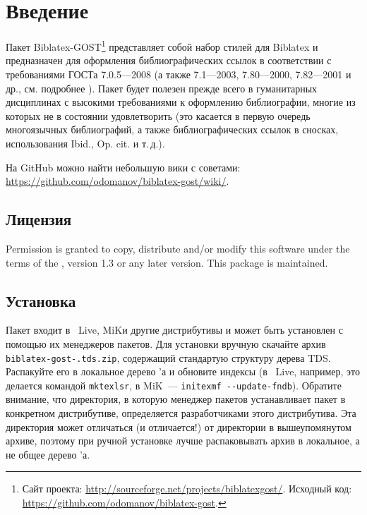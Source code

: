 \documentclass[10pt,a4paper,headings=small,numbers=enddot,english,russian]{ltxdockit}
\newcommand*{\biblatex}{Biblatex\xspace}
\newcommand*{\biblatexgost}{Biblatex-GOST\xspace}
\begin{document}
\printtitlepage
\tableofcontents
\listoftables

\section{Введение}
\label{sec:int}

Пакет \biblatexgost{}\footnote{Сайт проекта:
  \url{http://sourceforge.net/projects/biblatexgost/}. Исходный код:
  \url{https://github.com/odomanov/biblatex-gost}.} представляет собой
набор стилей для
\biblatex{}\unspace{}
и предназначен для оформления библиографических ссылок в соответствии
с требованиями ГОСТа 7.0.5---2008 (а также 7.1---2003, 7.80---2000,
7.82---2001 и др., см. подробнее ).
Пакет будет полезен прежде всего в гуманитарных дисциплинах с высокими
требованиями к оформлению библиографии, многие из которых \bibtex не в
состоянии удовлетворить (это касается в первую очередь многоязычных
библиографий, а также библиографических ссылок в сносках,
использования Ibid., Op. cit. и т.\,д.).

На GitHub можно найти небольшую вики с советами:
\url{https://github.com/odomanov/biblatex-gost/wiki/}.

\subsection{Лицензия}
\label{sec:lic}

Permission is granted to copy, distribute and\slash or modify this software under the
terms of the \lppl, version 1.3 or any later
version.
This package is maintained.

\subsection{Установка}
\label{sec:install}

Пакет входит в \tex~Live, MiK\tex и другие дистрибутивы и может быть установлен
с помощью их менеджеров пакетов. Для установки вручную скачайте архив
\texttt{biblatex-gost-.tds.zip}, содержащий стандартую структуру дерева TDS.
Распакуйте его в локальное дерево \tex'а и
обновите индексы (в \tex~Live, например, это делается командой \texttt{mktexlsr},
в MiK\tex~--- \texttt{initexmf -{}-update-fndb}). Обратите внимание, что директория,
в которую менеджер пакетов устанавливает пакет в конкретном дистрибутиве,
определяется разработчиками этого дистрибутива.
Эта директория может отличаться (и отличается!) от директории
в вышеупомянутом архиве, поэтому при ручной установке лучше распаковывать
архив в локальное, а не общее дерево \tex'а.
\end{document}
